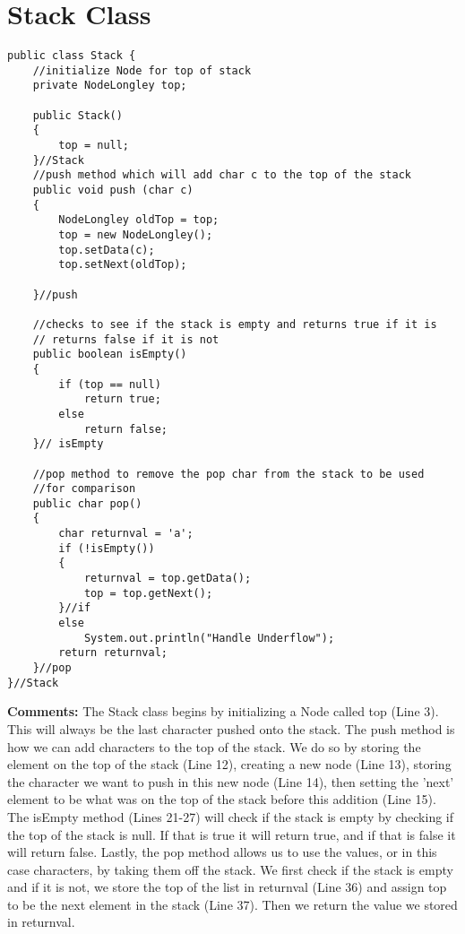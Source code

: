\documentclass{article}
\begin{document}
\pagebreak
\section{Stack Class}
\begin{lstlisting}[frame=single, 
backgroundcolor = \color{grey!12}]
public class Stack {
	//initialize Node for top of stack
	private NodeLongley top; 
	
	public Stack()
	{
		top = null;
	}//Stack
	//push method which will add char c to the top of the stack
	public void push (char c)
	{
		NodeLongley oldTop = top;
		top = new NodeLongley();
		top.setData(c);
		top.setNext(oldTop);

	}//push
	
	//checks to see if the stack is empty and returns true if it is
	// returns false if it is not
	public boolean isEmpty() 
	{
		if (top == null)
			return true;
		else
			return false;
	}// isEmpty
	
	//pop method to remove the pop char from the stack to be used 
	//for comparison
	public char pop()
	{
		char returnval = 'a';
		if (!isEmpty())
		{
			returnval = top.getData();
			top = top.getNext();
		}//if
		else
			System.out.println("Handle Underflow");
		return returnval; 
	}//pop
}//Stack
\end{lstlisting}
\textbf{Comments:}
The Stack class begins by initializing a Node called top (Line 3). This will always be the last character pushed onto the stack. The push method is how we can add characters to the top of the stack. We do so by storing the element on the top of the stack (Line 12), creating a new node (Line 13), storing the character we want to push in this new node (Line 14), then setting the 'next' element to be what was on the top of the stack before this addition (Line 15). The isEmpty method (Lines 21-27) will check if the stack is empty by checking if the top of the stack is null. If that is true it will return true, and if that is false it will return false. Lastly, the pop method allows us to use the values, or in this case characters, by taking them off the stack. We first check if the stack is empty and if it is not, we store the top of the list in returnval (Line 36) and assign top to be the next element in the stack (Line 37). Then we return the value we stored in returnval. 

\pagebreak
\end{document}
